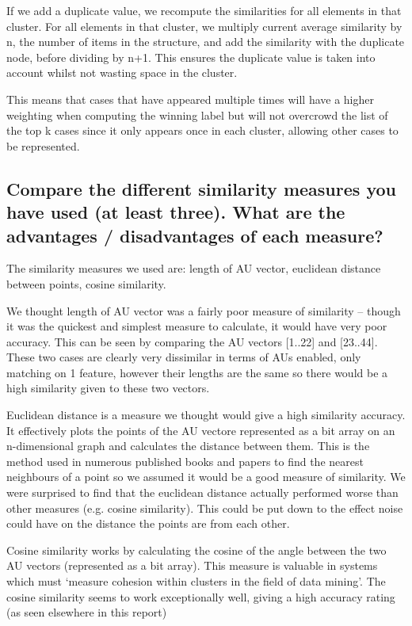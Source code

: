\documentclass[11pt]{article}
\begin{document}
If we add a duplicate value, we recompute the similarities for all elements in that cluster.
For all elements in that cluster, we multiply current average similarity by n, 
the number of items in the structure, and add
the similarity with the duplicate node, before dividing by n+1. This ensures the duplicate
value is taken into account whilst not wasting space in the cluster.

This means that cases that have appeared multiple times will have a higher weighting when computing the winning label but will not overcrowd the list of the top k cases since it only appears once in each cluster, allowing other cases to be represented.

\subsection{Compare the different similarity measures you have used (at least three). What are the advantages / disadvantages of each measure?}

The similarity measures we used are: length of AU vector, euclidean distance between points, 
cosine similarity.

We thought length of AU vector was a fairly poor measure of similarity -- though it was the
quickest and simplest measure to calculate, it would have very poor accuracy. This can be seen
by comparing the AU vectors [1..22] and [23..44]. These two cases are clearly very
dissimilar in terms of AUs enabled, only matching on 1 feature, however their lengths are
the same so there would be a high similarity given to these two vectors.

Euclidean distance is a measure we thought would give a high similarity accuracy. It
effectively plots the points of the AU vectore represented as a bit array
on an n-dimensional graph and calculates the
distance between them. This is the method used in numerous published books and papers
to find the nearest neighbours of a point so we assumed it would be a good measure of
similarity. We were surprised to find that the euclidean distance actually performed 
worse than other measures (e.g. cosine similarity). This could be put down to the effect
noise could have on the distance the points are from each other.

Cosine similarity works by calculating the cosine of the angle between the two AU vectors
(represented as a bit array). This measure is valuable in systems which must 
`measure cohesion within clusters in the field of data mining'. The cosine similarity
seems to work exceptionally well, giving a high accuracy rating (as seen elsewhere in this
report)
\end{document}

